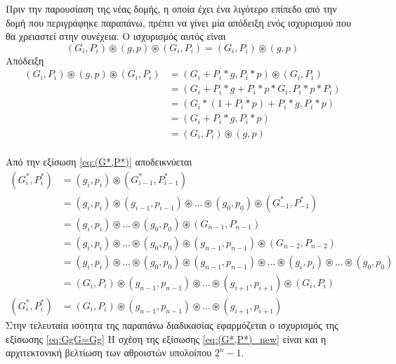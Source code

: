 Πριν την παρουσίαση της νέας δομής, η οποία έχει ένα λιγότερο επίπεδο από την δομή 
που περιγράφηκε παραπάνω, πρέπει να γίνει μία απόδειξη ενός ισχυρισμού που θα χρειαστεί στην 
συνέχεια. Ο ισχυρισμός αυτός είναι
\begin{equation}
\label{eq:GgG=Gg}
    (G_i,P_i)\circledast(g,p)\circledast(G_i,P_i) = (G_i,P_i)\circledast(g,p)
\end{equation}
Απόδειξη
\begin{equation*}
    \begin{split}
        (G_i,P_i)\circledast(g,p)\circledast(G_i,P_i) &= (G_i + P_i*g,P_i*p) \circledast (G_i,P_i) \\
        &= (G_i + P_i*g + P_i*p*G_i , P_i*p*P_i)\\
        &= (G_i*(1 + P_i*p) + P_i*g , P_i*p )\\
        &= (G_i + P_i*g , P_i * p)\\
        &= (G_i,P_i) \circledast (g,p)
    \end{split}
\end{equation*}
\\
Από την εξίσωση \ref{eq:(G*,P*)} αποδεικνύεται 
\begin{equation}
\label{eq:(G*,P*)_new}
    \begin{split}
        (G^*_i,P^*_i) &= (g_i,p_i) \circledast (G^*_{i-1},P^*_{i-1})\\
        &= (g_i,p_i) \circledast (g_{i-1},p_{i-1}) \circledast ... \circledast (g_0,p_0) \circledast (G^*_{-1},P^*_{-1})\\
        &= (g_i,p_i) \circledast ... \circledast (g_0,p_0) \circledast (G_{n-1},P_{n-1})\\
        &= (g_i,p_i) \circledast ... \circledast (g_0,p_0) \circledast (g_{n-1},p_{n-1}) \circledast (G_{n-2},P_{n-2})\\
        &= (g_i,p_i) \circledast ... \circledast (g_0,p_0) \circledast (g_{n-1},p_{n-1})
        \circledast ... \circledast (g_i,p_i) \circledast ... \circledast (g_0,p_0)\\
        &= (G_i,P_i) \circledast (g_{n-1},p_{n-1}) \circledast ... \circledast (g_{i+1},p_{i+1})
        \circledast (G_i,P_i)\\
        (G^*_i,P^*_i) &= (G_i,P_i) \circledast (g_{n-1},p_{n-1}) \circledast ... \circledast (g_{i+1},p_{i+1})
    \end{split}
\end{equation}
Στην τελευταία ισότητα της παραπάνω διαδικασίας εφαρμόζεται ο ισχυρισμός της εξίσωσης \ref{eq:GgG=Gg}
Η σχέση της εξίσωσης \ref{eq:(G*,P*)_new} είναι και η αρχιτεκτονική βελτίωση των αθροιστών υπολοίπου
$2^n-1$.

